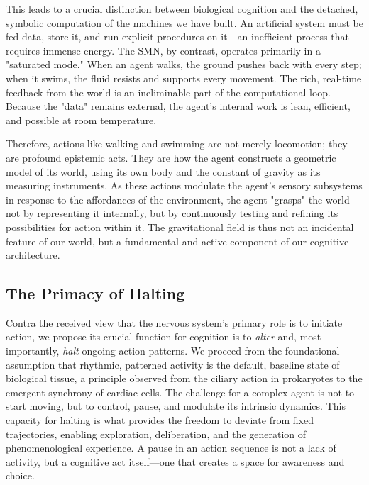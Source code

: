 This leads to a crucial distinction between biological cognition and the detached, symbolic computation of the machines we have built. An artificial system must be fed data, store it, and run explicit procedures on it—an inefficient process that requires immense energy. The SMN, by contrast, operates primarily in a "saturated mode." When an agent walks, the ground pushes back with every step; when it swims, the fluid resists and supports every movement. The rich, real-time feedback from the world is an ineliminable part of the computational loop. Because the "data" remains external, the agent's internal work is lean, efficient, and possible at room temperature.

Therefore, actions like walking and swimming are not merely locomotion; they are profound epistemic acts. They are how the agent constructs a geometric model of its world, using its own body and the constant of gravity as its measuring instruments. As these actions modulate the agent's sensory subsystems in response to the affordances of the environment, the agent "grasps" the world—not by representing it internally, but by continuously testing and refining its possibilities for action within it. The gravitational field is thus not an incidental feature of our world, but a fundamental and active component of our cognitive architecture.

\subsection*{The Primacy of Halting}
Contra the received view that the nervous system's primary role is to initiate action, we propose its crucial function for cognition is to \textit{alter} and, most importantly, \textit{halt} ongoing action patterns. We proceed from the foundational assumption that rhythmic, patterned activity is the default, baseline state of biological tissue, a principle observed from the ciliary action in prokaryotes to the emergent synchrony of cardiac cells. The challenge for a complex agent is not to start moving, but to control, pause, and modulate its intrinsic dynamics. This capacity for halting is what provides the freedom to deviate from fixed trajectories, enabling exploration, deliberation, and the generation of phenomenological experience. A pause in an action sequence is not a lack of activity, but a cognitive act itself—one that creates a space for awareness and choice.

